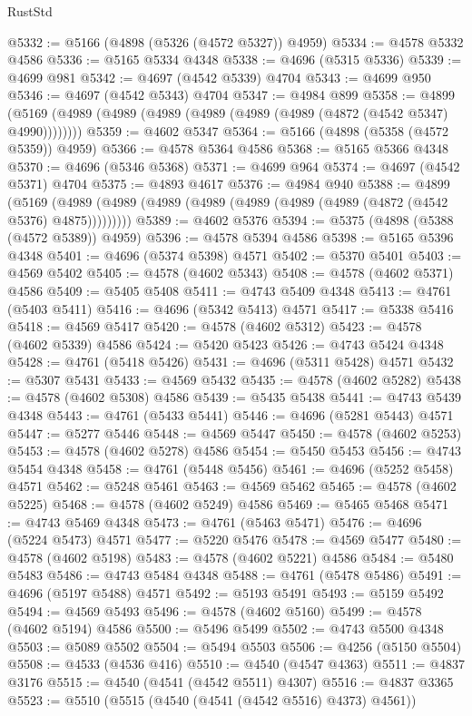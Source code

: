 \begin{lexlean}{RustStd}
\begin{coremodule}
@5332 := @5166 (@4898 (@5326 (@4572 @5327)) @4959)
@5334 := @4578 @5332 @4586
@5336 := @5165 @5334 @4348
@5338 := @4696 (@5315 @5336)
@5339 := @4699 @981
@5342 := @4697 (@4542 @5339) @4704
@5343 := @4699 @950
@5346 := @4697 (@4542 @5343) @4704
@5347 := @4984 @899
@5358 := @4899 (@5169 (@4989 (@4989 (@4989 (@4989 (@4989 (@4989 (@4872 (@4542 @5347) @4990))))))))
@5359 := @4602 @5347
@5364 := @5166 (@4898 (@5358 (@4572 @5359)) @4959)
@5366 := @4578 @5364 @4586
@5368 := @5165 @5366 @4348
@5370 := @4696 (@5346 @5368)
@5371 := @4699 @964
@5374 := @4697 (@4542 @5371) @4704
@5375 := @4893 @4617
@5376 := @4984 @940
@5388 := @4899
    (@5169 (@4989 (@4989 (@4989 (@4989 (@4989 (@4989 (@4989 (@4872 (@4542 @5376) @4875)))))))))
@5389 := @4602 @5376
@5394 := @5375 (@4898 (@5388 (@4572 @5389)) @4959)
@5396 := @4578 @5394 @4586
@5398 := @5165 @5396 @4348
@5401 := @4696 (@5374 @5398) @4571
@5402 := @5370 @5401
@5403 := @4569 @5402
@5405 := @4578 (@4602 @5343)
@5408 := @4578 (@4602 @5371) @4586
@5409 := @5405 @5408
@5411 := @4743 @5409 @4348
@5413 := @4761 (@5403 @5411)
@5416 := @4696 (@5342 @5413) @4571
@5417 := @5338 @5416
@5418 := @4569 @5417
@5420 := @4578 (@4602 @5312)
@5423 := @4578 (@4602 @5339) @4586
@5424 := @5420 @5423
@5426 := @4743 @5424 @4348
@5428 := @4761 (@5418 @5426)
@5431 := @4696 (@5311 @5428) @4571
@5432 := @5307 @5431
@5433 := @4569 @5432
@5435 := @4578 (@4602 @5282)
@5438 := @4578 (@4602 @5308) @4586
@5439 := @5435 @5438
@5441 := @4743 @5439 @4348
@5443 := @4761 (@5433 @5441)
@5446 := @4696 (@5281 @5443) @4571
@5447 := @5277 @5446
@5448 := @4569 @5447
@5450 := @4578 (@4602 @5253)
@5453 := @4578 (@4602 @5278) @4586
@5454 := @5450 @5453
@5456 := @4743 @5454 @4348
@5458 := @4761 (@5448 @5456)
@5461 := @4696 (@5252 @5458) @4571
@5462 := @5248 @5461
@5463 := @4569 @5462
@5465 := @4578 (@4602 @5225)
@5468 := @4578 (@4602 @5249) @4586
@5469 := @5465 @5468
@5471 := @4743 @5469 @4348
@5473 := @4761 (@5463 @5471)
@5476 := @4696 (@5224 @5473) @4571
@5477 := @5220 @5476
@5478 := @4569 @5477
@5480 := @4578 (@4602 @5198)
@5483 := @4578 (@4602 @5221) @4586
@5484 := @5480 @5483
@5486 := @4743 @5484 @4348
@5488 := @4761 (@5478 @5486)
@5491 := @4696 (@5197 @5488) @4571
@5492 := @5193 @5491
@5493 := @5159 @5492
@5494 := @4569 @5493
@5496 := @4578 (@4602 @5160)
@5499 := @4578 (@4602 @5194) @4586
@5500 := @5496 @5499
@5502 := @4743 @5500 @4348
@5503 := @5089 @5502
@5504 := @5494 @5503
@5506 := @4256 (@5150 @5504)
@5508 := @4533 (@4536 @416)
@5510 := @4540 (@4547 @4363)
@5511 := @4837 @3176
@5515 := @4540 (@4541 (@4542 @5511) @4307)
@5516 := @4837 @3365
@5523 := @5510 (@5515 (@4540 (@4541 (@4542 @5516) @4373) @4561))

\end{coremodule}
\end{lexlean}
